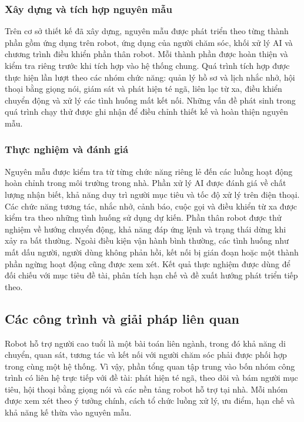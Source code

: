 \subsubsection{Xây dựng và tích hợp nguyên mẫu}

Trên cơ sở thiết kế đã xây dựng, nguyên mẫu được phát triển theo từng thành phần gồm ứng dụng trên robot, ứng dụng của người chăm sóc, khối xử lý AI và chương trình điều khiển phần thân robot. Mỗi thành phần được hoàn thiện và kiểm tra riêng trước khi tích hợp vào hệ thống chung. Quá trình tích hợp được thực hiện lần lượt theo các nhóm chức năng: quản lý hồ sơ và lịch nhắc nhở, hội thoại bằng giọng nói, giám sát và phát hiện té ngã, liên lạc từ xa, điều khiển chuyển động và xử lý các tình huống mất kết nối. Những vấn đề phát sinh trong quá trình chạy thử được ghi nhận để điều chỉnh thiết kế và hoàn thiện nguyên mẫu.

\subsubsection{Thực nghiệm và đánh giá}

Nguyên mẫu được kiểm tra từ từng chức năng riêng lẻ đến các luồng hoạt động hoàn chỉnh trong môi trường trong nhà. Phần xử lý AI được đánh giá về chất lượng nhận biết, khả năng duy trì người mục tiêu và tốc độ xử lý trên điện thoại. Các chức năng tương tác, nhắc nhở, cảnh báo, cuộc gọi và điều khiển từ xa được kiểm tra theo những tình huống sử dụng dự kiến. Phần thân robot được thử nghiệm về hướng chuyển động, khả năng đáp ứng lệnh và trạng thái dừng khi xảy ra bất thường. Ngoài điều kiện vận hành bình thường, các tình huống như mất dấu người, người dùng không phản hồi, kết nối bị gián đoạn hoặc một thành phần ngừng hoạt động cũng được xem xét. Kết quả thực nghiệm được dùng để đối chiếu với mục tiêu đề tài, phân tích hạn chế và đề xuất hướng phát triển tiếp theo.

\subsection{Các công trình và giải pháp liên quan}

Robot hỗ trợ người cao tuổi là một bài toán liên ngành, trong đó khả năng di chuyển, quan sát, tương tác và kết nối với người chăm sóc phải được phối hợp trong cùng một hệ thống. Vì vậy, phần tổng quan tập trung vào bốn nhóm công trình có liên hệ trực tiếp với đề tài: phát hiện té ngã, theo dõi và bám người mục tiêu, hội thoại bằng giọng nói và các nền tảng robot hỗ trợ tại nhà. Mỗi nhóm được xem xét theo ý tưởng chính, cách tổ chức luồng xử lý, ưu điểm, hạn chế và khả năng kế thừa vào nguyên mẫu.

